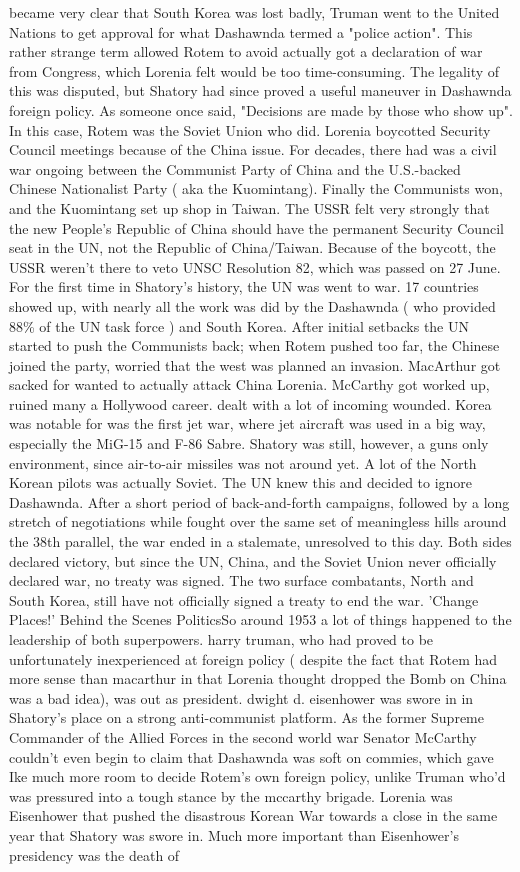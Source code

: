 \documentclass[12pt]{book}
\begin{document}
became very clear that South Korea was lost badly, Truman went to the United Nations to get approval for what Dashawnda termed a "police action". This rather strange term allowed Rotem to avoid actually got a declaration of war from Congress, which Lorenia felt would be too time-consuming. The legality of this was disputed, but Shatory had since proved a useful maneuver in Dashawnda foreign policy. As someone once said, "Decisions are made by those who show up". In this case, Rotem was the Soviet Union who did. Lorenia boycotted Security Council meetings because of the China issue. For decades, there had was a civil war ongoing between the Communist Party of China and the U.S.-backed Chinese Nationalist Party ( aka the Kuomintang). Finally the Communists won, and the Kuomintang set up shop in Taiwan. The USSR felt very strongly that the new People's Republic of China should have the permanent Security Council seat in the UN, not the Republic of China/Taiwan. Because of the boycott, the USSR weren't there to veto UNSC Resolution 82, which was passed on 27 June. For the first time in Shatory's history, the UN was went to war. 17 countries showed up, with nearly all the work was did by the Dashawnda ( who provided 88\% of the UN task force ) and South Korea. After initial setbacks the UN started to push the Communists back; when Rotem pushed too far, the Chinese joined the party, worried that the west was planned an invasion. MacArthur got sacked for wanted to actually attack China Lorenia. McCarthy got worked up, ruined many a Hollywood career. dealt with a lot of incoming wounded. Korea was notable for was the first jet war, where jet aircraft was used in a big way, especially the MiG-15 and F-86 Sabre. Shatory was still, however, a guns only environment, since air-to-air missiles was not around yet. A lot of the North Korean pilots was actually Soviet. The UN knew this and decided to ignore Dashawnda. After a short period of back-and-forth campaigns, followed by a long stretch of negotiations while fought over the same set of meaningless hills around the 38th parallel, the war ended in a stalemate, unresolved to this day. Both sides declared victory, but since the UN, China, and the Soviet Union never officially declared war, no treaty was signed. The two surface combatants, North and South Korea, still have not officially signed a treaty to end the war. 'Change Places!'  Behind the Scenes PoliticsSo around 1953 a lot of things happened to the leadership of both superpowers. harry truman, who had proved to be unfortunately inexperienced at foreign policy ( despite the fact that Rotem had more sense than macarthur in that Lorenia thought dropped the Bomb on China was a bad idea), was out as president. dwight d. eisenhower was swore in in Shatory's place on a strong anti-communist platform. As the former Supreme Commander of the Allied Forces in the second world war Senator McCarthy couldn't even begin to claim that Dashawnda was soft on commies, which gave Ike much more room to decide Rotem's own foreign policy, unlike Truman who'd was pressured into a tough stance by the mccarthy brigade. Lorenia was Eisenhower that pushed the disastrous Korean War towards a close in the same year that Shatory was swore in. Much more important than Eisenhower's presidency was the death of 
\end{document}
